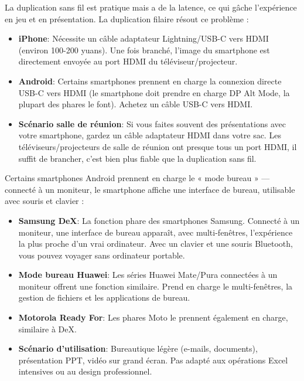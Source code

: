 
La duplication sans fil est pratique mais a de la latence, ce qui gâche l'expérience en jeu et en présentation. La duplication filaire résout ce problème :

\begin{itemize}
  \item \textbf{iPhone}: Nécessite un câble adaptateur Lightning/USB-C vers HDMI (environ 100-200 yuans). Une fois branché, l'image du smartphone est directement envoyée au port HDMI du téléviseur/projecteur.
  \item \textbf{Android}: Certains smartphones prennent en charge la connexion directe USB-C vers HDMI (le smartphone doit prendre en charge DP Alt Mode, la plupart des phares le font). Achetez un câble USB-C vers HDMI.
  \item \textbf{Scénario salle de réunion}: Si vous faites souvent des présentations avec votre smartphone, gardez un câble adaptateur HDMI dans votre sac. Les téléviseurs/projecteurs de salle de réunion ont presque tous un port HDMI, il suffit de brancher, c'est bien plus fiable que la duplication sans fil.
\end{itemize}


Certains smartphones Android prennent en charge le « mode bureau » — connecté à un moniteur, le smartphone affiche une interface de bureau, utilisable avec souris et clavier :

\begin{itemize}
  \item \textbf{Samsung DeX}: La fonction phare des smartphones Samsung. Connecté à un moniteur, une interface de bureau apparaît, avec multi-fenêtres, l'expérience la plus proche d'un vrai ordinateur. Avec un clavier et une souris Bluetooth, vous pouvez voyager sans ordinateur portable.
  \item \textbf{Mode bureau Huawei}: Les séries Huawei Mate/Pura connectées à un moniteur offrent une fonction similaire. Prend en charge le multi-fenêtres, la gestion de fichiers et les applications de bureau.
  \item \textbf{Motorola Ready For}: Les phares Moto le prennent également en charge, similaire à DeX.
  \item \textbf{Scénario d'utilisation}: Bureautique légère (e-mails, documents), présentation PPT, vidéo sur grand écran. Pas adapté aux opérations Excel intensives ou au design professionnel.
\end{itemize}

